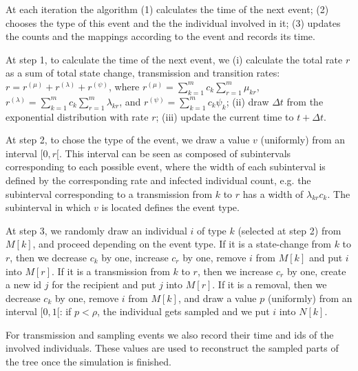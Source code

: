 \documentclass[a4paper,10pt]{article}
\begin{document}
At each iteration the algorithm (1) calculates the time of the next event; (2) chooses the type of this event and the the individual involved in it; (3) updates the counts and the mappings according to the event and records its time.

At step 1, to calculate the time of the next event, we (i) calculate the total rate $r$ as a sum of total state change, transmission and transition rates: $r = r^{(\mu)} + r^{(\lambda)} + r^{(\psi)}$, where $r^{(\mu)} = \sum\limits_{k=1}^{m} c_k \sum\limits_{r=1}^{m} \mu_{kr}$, $r^{(\lambda)} = \sum\limits_{k=1}^{m} c_k \sum\limits_{r=1}^{m} \lambda_{kr}$, and $r^{(\psi)} = \sum\limits_{k=1}^{m} c_k \psi_{k}$; (ii) draw $\Delta t$ from the exponential distribution with rate $r$; (iii) update the current time to $t + \Delta t$.

At step 2, to chose the type of the event, we draw a value $v$ (uniformly) from an interval $[0, r[$. This interval can be seen as composed of subintervals corresponding to each possible event, where the width of each subinterval is defined by the corresponding rate and infected individual count, e.g. the subinterval corresponding to a transmission from $k$ to $r$ has a width of $\lambda_{kr}c_k$. The subinterval in which $v$ is located defines the event type.

At step 3, we randomly draw an individual $i$ of type $k$ (selected at step 2) from $M[k]$, and proceed depending on the event type. If it is a state-change from $k$ to $r$, then we decrease $c_k$ by one, increase $c_r$ by one, remove $i$ from $M[k]$ and put $i$ into $M[r]$. If it is a transmission from $k$ to $r$, then we increase $c_r$ by one, create a new id $j$ for the recipient and put $j$ into $M[r]$. If it is a removal, then we decrease $c_k$ by one, remove $i$ from $M[k]$, and draw a value $p$ (uniformly) from an interval $[0, 1[$: if $p < \rho$, the individual gets sampled and we put $i$ into $N[k]$. 

For transmission and sampling events we also record their time and ids of the involved individuals. These values are used to reconstruct the sampled parts of the tree once the simulation is finished.
\end{document}
